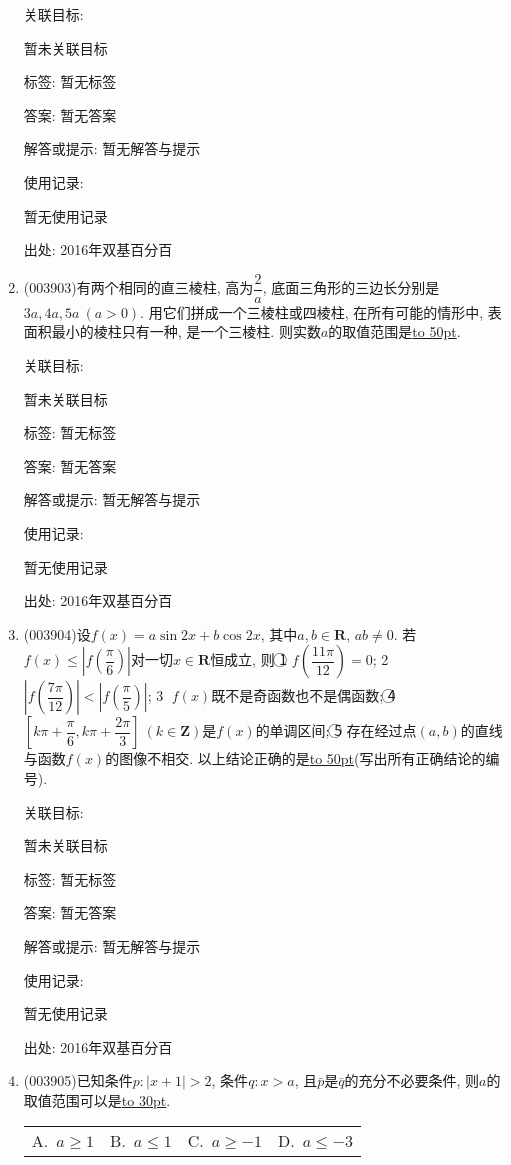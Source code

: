 \documentclass[10pt,a4paper]{article}
\newcommand{\blank}[1]{\underline{\hbox to #1pt{}}}
\newcommand{\fourch}[4]{\par\begin{tabular}{p{.23\textwidth}p{.23\textwidth}p{.23\textwidth}p{.23\textwidth}}
A.~#1 &B.~#2& C.~#3& D.~#4
\end{tabular}}
\begin{document}
\begin{enumerate}[1.]
关联目标:

暂未关联目标



标签: 暂无标签

答案: 暂无答案

解答或提示: 暂无解答与提示

使用记录:

暂无使用记录


出处: 2016年双基百分百
\item { (003903)}有两个相同的直三棱柱, 高为$\dfrac 2a$, 底面三角形的三边长分别是$3a,4a,5a \ (a>0)$. 用它们拼成一个三棱柱或四棱柱, 在所有可能的情形中, 表面积最小的棱柱只有一种, 是一个三棱柱. 则实数$a$的取值范围是\blank{50}.


关联目标:

暂未关联目标



标签: 暂无标签

答案: 暂无答案

解答或提示: 暂无解答与提示

使用记录:

暂无使用记录


出处: 2016年双基百分百
\item { (003904)}设$f(x)=a\sin 2x+b\cos 2x$, 其中$a,b\in \mathbf{R}$, $ab\ne 0$. 若$f(x)\le \left|f\left(\dfrac{\pi}{6}\right)\right|$对一切$x\in \mathbf{R}$恒成立, 则
\textcircled{1} $f\left(\dfrac{11\pi}{12}\right)=0$; \textcircled{2} $\left|f\left(\dfrac{7\pi}{12}\right)\right|<\left|f\left(\dfrac{\pi}{5}\right)\right|$; \textcircled{3} $f(x)$既不是奇函数也不是偶函数; \textcircled{4} $\left[k\pi+\dfrac{\pi}{6},k\pi+\dfrac{2\pi}{3}\right] \ (k\in \mathbf{Z})$是$f(x)$的单调区间; \textcircled{5} 存在经过点$(a,b)$的直线与函数$f(x)$的图像不相交. 
以上结论正确的是\blank{50}(写出所有正确结论的编号).


关联目标:

暂未关联目标



标签: 暂无标签

答案: 暂无答案

解答或提示: 暂无解答与提示

使用记录:

暂无使用记录


出处: 2016年双基百分百
\item { (003905)}已知条件$p: |x+1|>2$, 条件$q: x>a$, 且$\bar{p}$是$\bar{q}$的充分不必要条件, 则$a$的取值范围可以是\blank{30}.
\fourch{$a\ge 1$}{$a\le 1$}{$a\ge -1$}{$a\le -3$}



\end{enumerate}
\end{document}
